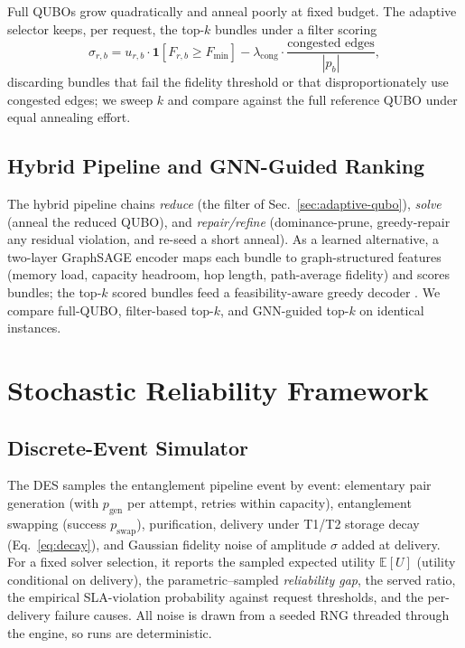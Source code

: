 \documentclass[twocolumn]{article}
\newcommand{\E}{\mathbb{E}}
\begin{document}
Full QUBOs grow quadratically and anneal poorly at fixed budget.  The
adaptive selector keeps, per request, the top-$k$ bundles under a
filter scoring
\begin{equation}
  \sigma_{r,b} = u_{r,b} \cdot \mathbf{1}[F_{r,b} \ge F_{\min}]
    - \lambda_{\text{cong}} \cdot \frac{\text{congested edges}}{|p_b|},
\end{equation}
discarding bundles that fail the fidelity threshold or that
disproportionately use congested edges; we sweep $k$ and compare
against the full reference QUBO under equal annealing effort.

\subsection{Hybrid Pipeline and GNN-Guided Ranking}
\label{sec:hybrid}

The hybrid pipeline chains \emph{reduce} (the filter of
Sec.~\ref{sec:adaptive-qubo}), \emph{solve} (anneal the reduced
QUBO), and \emph{repair/refine} (dominance-prune, greedy-repair any
residual violation, and re-seed a short anneal).  As a learned
alternative, a two-layer GraphSAGE encoder maps each bundle to
graph-structured features (memory load, capacity headroom, hop length,
path-average fidelity) and scores bundles; the top-$k$ scored bundles
feed a feasibility-aware greedy decoder
\cite{rusek2020routenets,mao2017routing}.  We compare full-QUBO,
filter-based top-$k$, and GNN-guided top-$k$ on identical instances.

\section{Stochastic Reliability Framework}
\label{sec:reliability}

\subsection{Discrete-Event Simulator}
\label{sec:des}

The DES samples the entanglement pipeline event by event: elementary
pair generation (with $p_{\text{gen}}$ per attempt, retries within
capacity), entanglement swapping (success $p_{\text{swap}}$),
purification, delivery under T1/T2 storage decay
(Eq.~\eqref{eq:decay}), and Gaussian fidelity noise of amplitude
$\sigma$ added at delivery.  For a fixed solver selection, it reports
the sampled expected utility $\E[U]$ (utility conditional on delivery),
the parametric--sampled \emph{reliability gap}, the served ratio, the
empirical SLA-violation probability against request thresholds, and
the per-delivery failure causes.  All noise is drawn from a seeded RNG
threaded through the engine, so runs are deterministic.
\end{document}
